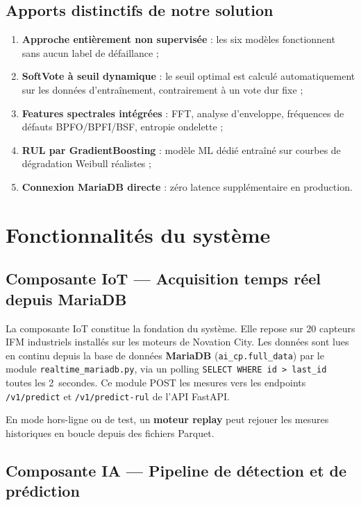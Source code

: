 \documentclass[12pt,a4paper]{report}
\begin{document}
\subsection{Apports distinctifs de notre solution}

\begin{enumerate}
  \item \textbf{Approche entièrement non supervisée} : les six modèles fonctionnent sans aucun label de défaillance ;
  \item \textbf{SoftVote à seuil dynamique} : le seuil optimal est calculé automatiquement sur les données d'entraînement, contrairement à un vote dur fixe ;
  \item \textbf{Features spectrales intégrées} : FFT, analyse d'enveloppe, fréquences de défauts BPFO/BPFI/BSF, entropie ondelette ;
  \item \textbf{RUL par GradientBoosting} : modèle ML dédié entraîné sur courbes de dégradation Weibull réalistes ;
  \item \textbf{Connexion MariaDB directe} : zéro latence supplémentaire en production.
\end{enumerate}

\section{Fonctionnalités du système}

\subsection{Composante IoT — Acquisition temps réel depuis MariaDB}

La composante IoT constitue la fondation du système. Elle repose sur 20 capteurs IFM
industriels installés sur les moteurs de Novation City. Les données sont lues en continu
depuis la base de données \textbf{MariaDB} (\texttt{ai\_cp.full\_data}) par le module
\texttt{realtime\_mariadb.py}, via un polling \texttt{SELECT WHERE id > last\_id} toutes
les 2~secondes. Ce module POST les mesures vers les endpoints \texttt{/v1/predict} et
\texttt{/v1/predict-rul} de l'API FastAPI.

En mode hors-ligne ou de test, un \textbf{moteur replay} peut rejouer les mesures
historiques en boucle depuis des fichiers Parquet.

\subsection{Composante IA — Pipeline de détection et de prédiction}
\end{document}
